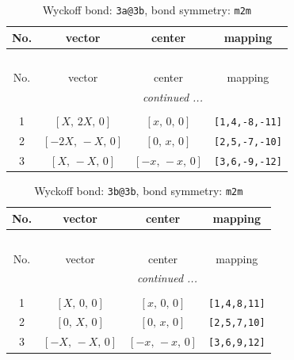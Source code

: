 \documentclass[fleqn,8pt]{jsarticle}
\begin{document}
\begin{longtable}{cccc}
\caption{Wyckoff bond: {\tt 3a@3b}, bond symmetry: {\tt m2m}}
 \\
 \hline \hline
No. & vector & center & mapping \\ \hline \endfirsthead

\multicolumn{3}{l}{\tablename\ \thetable{}} \\
 \hline \hline
No. & vector & center & mapping \\ \hline \endhead

 \hline \hline
\multicolumn{3}{r}{\footnotesize\it continued ...} \\ \endfoot

 \hline \hline
\multicolumn{3}{r}{} \\ \endlastfoot

1 & $\left[ X,\, 2 X,\, 0 \right]$ & $\left[ x,\, 0,\, 0 \right]$ & {\tt [1,4,-8,-11]} \\ \hline
2 & $\left[ - 2 X,\, - X,\, 0 \right]$ & $\left[ 0,\, x,\, 0 \right]$ & {\tt [2,5,-7,-10]} \\ \hline
3 & $\left[ X,\, - X,\, 0 \right]$ & $\left[ - x,\, - x,\, 0 \right]$ & {\tt [3,6,-9,-12]} \\
\end{longtable}
\renewcommand{\arraystretch}{1.2}
\begin{longtable}{cccc}
\caption{Wyckoff bond: {\tt 3b@3b}, bond symmetry: {\tt m2m}}
 \\
 \hline \hline
No. & vector & center & mapping \\ \hline \endfirsthead

\multicolumn{3}{l}{\tablename\ \thetable{}} \\
 \hline \hline
No. & vector & center & mapping \\ \hline \endhead

 \hline \hline
\multicolumn{3}{r}{\footnotesize\it continued ...} \\ \endfoot

 \hline \hline
\multicolumn{3}{r}{} \\ \endlastfoot

1 & $\left[ X,\, 0,\, 0 \right]$ & $\left[ x,\, 0,\, 0 \right]$ & {\tt [1,4,8,11]} \\ \hline
2 & $\left[ 0,\, X,\, 0 \right]$ & $\left[ 0,\, x,\, 0 \right]$ & {\tt [2,5,7,10]} \\ \hline
3 & $\left[ - X,\, - X,\, 0 \right]$ & $\left[ - x,\, - x,\, 0 \right]$ & {\tt [3,6,9,12]} \\
\end{longtable}
\end{document}
